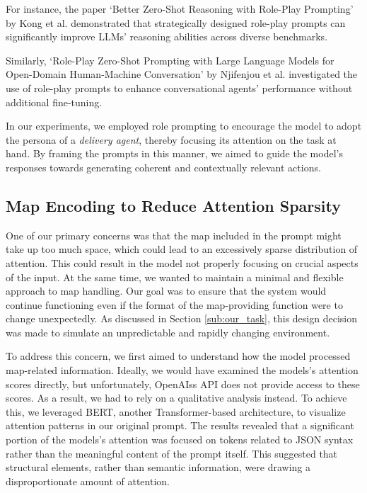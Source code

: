 For instance, the paper `Better Zero-Shot Reasoning with Role-Play Prompting' by
Kong et al. \cite{kong2024betterzeroshotreasoningroleplay} demonstrated that
strategically designed role-play prompts can significantly improve LLMs' reasoning
abilities across diverse benchmarks.

Similarly, `Role-Play Zero-Shot Prompting with Large Language Models for Open-Domain
Human-Machine Conversation' by Njifenjou et al. \cite{njifenjou2024roleplayzeroshotpromptinglarge}
investigated the use of role-play prompts to enhance conversational agents'
performance without additional fine-tuning.

In our experiments, we employed role prompting to encourage the model to adopt the
persona of a \emph{delivery agent}, thereby focusing its attention on the task at
hand. By framing the prompts in this manner, we aimed to guide the model's responses
towards generating coherent and contextually relevant actions.

\subsection{Map Encoding to Reduce Attention Sparsity}

One of our primary concerns was that the map included in the prompt might take
up too much space, which could lead to an excessively sparse distribution of attention.
This could result in the model not properly focusing on crucial aspects of the
input. At the same time, we wanted to maintain a minimal and flexible approach
to map handling. Our goal was to ensure that the system would continue functioning
even if the format of the map-providing function were to change unexpectedly. As
discussed in Section \ref{sub:our_task}, this design decision was made to simulate
an unpredictable and rapidly changing environment.

To address this concern, we first aimed to understand how the model processed
map-related information. Ideally, we would have examined the models's attention
scores directly, but unfortunately, OpenAIss API does not provide access to
these scores. As a result, we had to rely on a qualitative analysis instead. To achieve
this, we leveraged BERT, another Transformer-based architecture, to visualize
attention patterns in our original prompt. The results revealed that a significant
portion of the models's attention was focused on tokens related to JSON syntax rather
than the meaningful content of the prompt itself. This suggested that structural
elements, rather than semantic information, were drawing a disproportionate
amount of attention.

